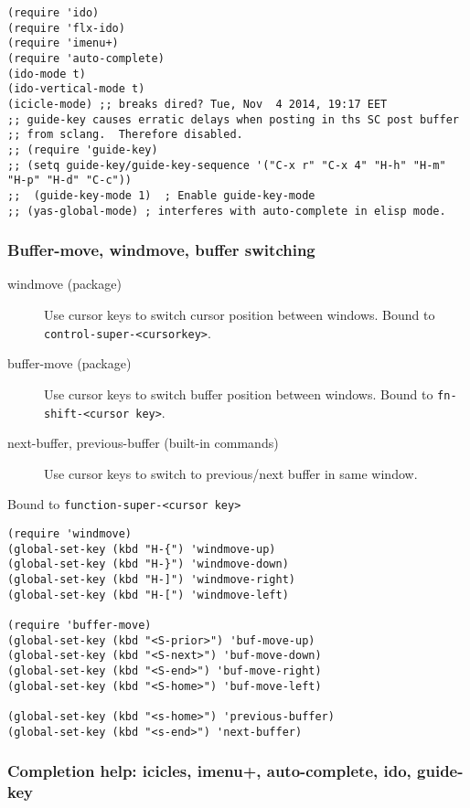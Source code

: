 \documentclass{article}
\begin{document}
\begin{verbatim}
(require 'ido)
(require 'flx-ido)
(require 'imenu+)
(require 'auto-complete)
(ido-mode t)
(ido-vertical-mode t)
(icicle-mode) ;; breaks dired? Tue, Nov  4 2014, 19:17 EET
;; guide-key causes erratic delays when posting in ths SC post buffer
;; from sclang.  Therefore disabled.
;; (require 'guide-key)
;; (setq guide-key/guide-key-sequence '("C-x r" "C-x 4" "H-h" "H-m" "H-p" "H-d" "C-c"))
;;  (guide-key-mode 1)  ; Enable guide-key-mode
;; (yas-global-mode) ; interferes with auto-complete in elisp mode.
\end{verbatim}


\subsubsection{Buffer-move, windmove, buffer switching}
\label{sec-1-11-7}

\begin{description}
\item[{windmove (package)}] Use cursor keys to switch cursor position between windows.  Bound to \texttt{control-super-<cursorkey>}.
\item[{buffer-move (package)}] Use cursor keys to switch buffer position between windows.  Bound to \texttt{fn-shift-<cursor key>}.
\item[{next-buffer, previous-buffer (built-in commands)}] Use cursor keys to switch to previous/next buffer in same window.
\end{description}

Bound to \texttt{function-super-<cursor key>}

\begin{verbatim}
(require 'windmove)
(global-set-key (kbd "H-{") 'windmove-up)
(global-set-key (kbd "H-}") 'windmove-down)
(global-set-key (kbd "H-]") 'windmove-right)
(global-set-key (kbd "H-[") 'windmove-left)

(require 'buffer-move)
(global-set-key (kbd "<S-prior>") 'buf-move-up)
(global-set-key (kbd "<S-next>") 'buf-move-down)
(global-set-key (kbd "<S-end>") 'buf-move-right)
(global-set-key (kbd "<S-home>") 'buf-move-left)

(global-set-key (kbd "<s-home>") 'previous-buffer)
(global-set-key (kbd "<s-end>") 'next-buffer)
\end{verbatim}
\subsubsection{Completion help: icicles, imenu+, auto-complete, ido, guide-key}
\label{sec-1-11-8}
\end{document}
